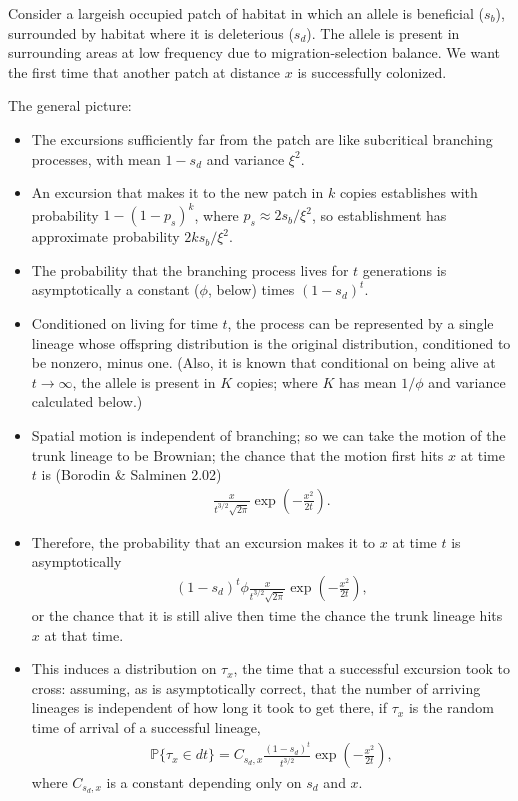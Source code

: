 \documentclass{article}
\renewcommand{\P}{\mathbb{P}}
\begin{document}
Consider a largeish occupied patch of habitat in which an allele is beneficial ($s_b$),
surrounded by habitat where it is deleterious ($s_d$).
The allele is present in surrounding areas at low frequency due to migration-selection balance.
We want the first time that another patch at distance $x$ is successfully colonized.

The general picture:
\begin{itemize}

\item The excursions sufficiently far from the patch are like subcritical branching processes,
with mean $1-s_d$ and variance $\xi^2$.

\item An excursion that makes it to the new patch in $k$ copies establishes with probability $1-(1-p_s)^k$,
where $p_s \approx 2s_b/\xi^2$, so establishment has approximate probability $2 k s_b / \xi^2$.

\item The probability that the branching process lives for $t$ generations is asymptotically a constant ($\phi$, below) times $(1-s_d)^t$.

\item Conditioned on living for time $t$, the process can be represented by a single lineage whose offspring distribution
is the original distribution, conditioned to be nonzero, minus one.
(Also, it is known that conditional on being alive at $t\to\infty$, the allele is present in $K$ copies; where $K$ has mean $1/\phi$ and variance calculated below.)

\item Spatial motion is independent of branching;
so we can take the motion of the trunk lineage to be Brownian;
the chance that the motion first hits $x$ at time $t$ is (Borodin \& Salminen 2.02)
\begin{align}
\frac{x}{t^{3/2}\sqrt{2\pi}} \exp\left(-\frac{x^2}{2t}\right) .
\end{align}

\item Therefore, the probability that an excursion makes it to $x$ at time $t$ is asymptotically
\begin{align}
  (1-s_d)^t \phi \frac{x}{t^{3/2}\sqrt{2\pi}} \exp\left(-\frac{x^2}{2t}\right) ,
\end{align}
or the chance that it is still alive then time the chance the trunk lineage hits $x$ at that time.

\item This induces a distribution on $\tau_x$, the time that a successful excursion took to cross:
assuming, as is asymptotically correct, that the number of arriving lineages is independent of how long it took to get there,
if $\tau_x$ is the random time of arrival of a successful lineage,
\begin{align} \label{eqn:arrival_time_density}
 \P\{\tau_x \in dt\} = C_{s_d,x} \frac{(1-s_d)^t}{t^{3/2}} \exp\left(-\frac{x^2}{2t}\right) ,
\end{align}
where $C_{s_d,x}$ is a constant depending only on $s_d$ and $x$.



\end{itemize}
\end{document}
